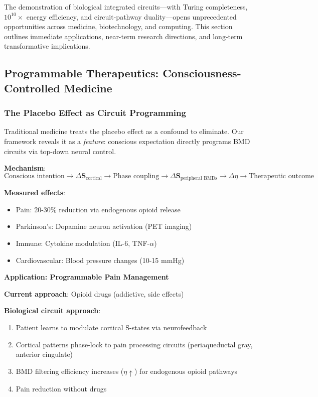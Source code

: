 \documentclass[11pt,a4paper]{article}
\begin{document}
The demonstration of biological integrated circuits—with Turing completeness, $10^{10}\times$ energy efficiency, and circuit-pathway duality—opens unprecedented opportunities across medicine, biotechnology, and computing. This section outlines immediate applications, near-term research directions, and long-term transformative implications.

\subsection{Programmable Therapeutics: Consciousness-Controlled Medicine}

\subsubsection{The Placebo Effect as Circuit Programming}

Traditional medicine treats the placebo effect as a confound to eliminate. Our framework reveals it as a \textit{feature}: conscious expectation directly programs BMD circuits via top-down neural control\cite{benedetti2014placebo}.

\textbf{Mechanism}:
\begin{equation}
\text{Conscious intention} \to \Delta \mathbf{S}_{\text{cortical}} \to \text{Phase coupling} \to \Delta \mathbf{S}_{\text{peripheral BMDs}} \to \Delta \eta \to \text{Therapeutic outcome}
\end{equation}

\textbf{Measured effects}\cite{benedetti2014placebo}:
\begin{itemize}
\item Pain: 20-30\% reduction via endogenous opioid release
\item Parkinson's: Dopamine neuron activation (PET imaging)
\item Immune: Cytokine modulation (IL-6, TNF-$\alpha$)
\item Cardiovascular: Blood pressure changes (10-15 mmHg)
\end{itemize}

\textbf{Application: Programmable Pain Management}

\textbf{Current approach}: Opioid drugs (addictive, side effects)

\textbf{Biological circuit approach}:
\begin{enumerate}
\item Patient learns to modulate cortical S-states via neurofeedback
\item Cortical patterns phase-lock to pain processing circuits (periaqueductal gray, anterior cingulate)
\item BMD filtering efficiency increases ($\eta \uparrow$) for endogenous opioid pathways
\item Pain reduction without drugs
\end{enumerate}
\end{document}

